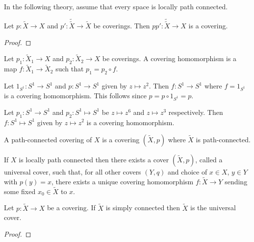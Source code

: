 \documentclass{article}
\begin{document}
In the following theory, assume that every space is locally path connected.

\begin{proposition}
  Let $p:\tilde X\to X$ and $p':\tilde{\tilde X}\to\tilde X$ be coverings.
  Then $pp':\tilde{\tilde{X}}\to X$ is a covering.
  \begin{proof}
    \missingproof
  \end{proof}
\end{proposition}

\begin{definition}
  Let $p_1:\tilde X_1\to X$ and $p_2:\tilde X_2\to X$ be coverings. A covering homomorphism
  is a map $f:\tilde X_1\to\tilde X_2$ such that $p_1 = p_2\circ f$.
\end{definition}

\begin{example}
  Let $1_{S^1} : S^1 \to S^1$ and $p : S^1 \to S^1$  given by $z \mapsto z^2$. 
  Then $f : S^1 \to S^1$ where $f = 1_{S^1}$ is a covering homomorphism.
  This follows since $p = p \circ 1_{S^1} = p$. 
\end{example}

\begin{example}
  Let $p_1 : S^1 \to S^1$ and $p_2 : S^1 \mapsto S^1$ be $z \mapsto z^6$ and $z \mapsto z^3$ respectively. 
  Then $f : S^1 \mapsto S^1$ given by $z \mapsto z^2$ is a covering homomorphism. 
\end{example}

\begin{definition}
  A path-connected covering of $X$ is a covering $(\tilde X,p)$ where $\tilde X$ is
  path-connected.
\end{definition}

\begin{theorem}
  If $X$ is locally path connected then there exists a cover
  $(\tilde X,p)$, called a universal cover, such that, for all other covers $(Y,q)$ and choice of $x\in X$, $y\in Y$
  with $p(y)=x$, there exists a unique covering homomorphism $f: \tilde X \to Y$ sending some fixed $x_0 \in \tilde X$ to $x$.
\end{theorem}

\begin{example}
  \missingexample
\end{example}

\begin{theorem}
  Let $p:\tilde X\to X$ be a covering. If $\tilde X$ is simply connected then
  $\tilde X$ is the universal cover.
  \begin{proof}
    \missingproof
  \end{proof}
\end{theorem}
\end{document}
